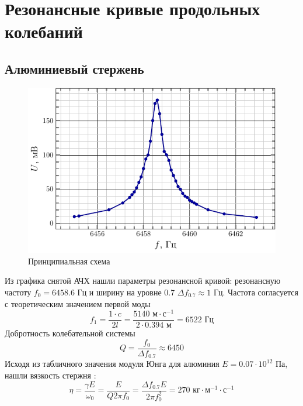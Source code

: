 
\newpage

\section{Резонансные кривые продольных колебаний}
\subsection{Алюминиевый стержень}
\begin{figure}[H]
	\centering
	\includegraphics[scale=1.5]{fig/al_afc}
	\caption{Принципиальная схема}
	\label{fig:chem1}
\end{figure}

Из графика снятой АЧХ нашли параметры резонансной кривой: резонансную частоту
$f_0=6458.6\text{ Гц}$ и ширину на уровне 0.7 $\Delta f_{0.7} \approx 1\text{ Гц}$. 
Частота согласуется с теоретическим значением первой моды
\begin{equation}
	f_1 = \frac{1\cdot c}{2l} = \frac{5140 \text{ м}\cdot\text{с}^{-1}}{2\cdot 0.394\text{ м}}=6522 \text{ Гц}
\end{equation}
Добротность колебательной системы
\begin{equation}
	Q = \frac{f_0}{\Delta f_{0.7}} \approx 6450
\end{equation}
Исходя из табличного значения модуля Юнга для алюминия $E=0.07\cdot10^{12}$ Па, нашли вязкость стержня  \cite[стр. 10]{met}:
\begin{equation}
	\eta = \frac{\gamma E}{\omega_0}= \frac{ E}{Q 2\pi f_0} = \frac{\Delta f_{0.7} E}{2\pi f_0^2}= 270 \text{ кг}\cdot\text{м}^{-1}\cdot\text{с}^{-1}
\end{equation}


